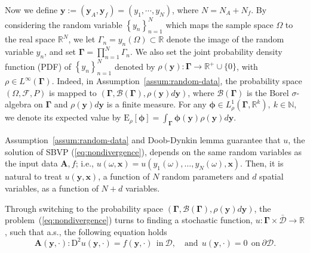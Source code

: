 \documentclass[final,onefignum,onetabnum]{mousaviart}
\begin{document}
	\vspace*{1mm}
	Now we define $\boldsymbol{y} := (\boldsymbol{y}_A, \boldsymbol{y}_f) = (y_1, \cdots, y_N)$, where $N= N_A + N_f$. By considering the random variable $\left\lbrace y_n \right\rbrace _{n=1}^{N}$ which maps the sample space $\Omega$ to the real space $\mathbb{R}^N$, we let $\Gamma_n =y_{n}(\Omega) \subset \mathbb{R} $ denote the image of the random variable $y_n$, and set $\boldsymbol{\Gamma} = \prod_{n= 1}^{N} {\Gamma_n}$. We also set the joint probability density function (PDF) of $\left\lbrace y_n \right\rbrace  _{n= 1}^N$ denoted by $\rho(\boldsymbol{y}):\boldsymbol{\Gamma} \rightarrow \mathbb{R}^{+} \cup \lbrace 0 \rbrace $, with $\rho \in L^\infty(\boldsymbol{\Gamma})$.
	Indeed, in Assumption~\ref{assum:random-data}, the probability space $(\Omega, \mathcal{F}, P)$ is mapped to $(\boldsymbol{\Gamma}, \mathcal{B}(\boldsymbol{\Gamma}), \rho(\boldsymbol{y}) d\boldsymbol{y})$, where $\mathcal{B}(\boldsymbol{\Gamma})$ is the Borel $\sigma$-algebra on $\boldsymbol{\Gamma}$ and $\rho(\boldsymbol{y}) d\boldsymbol{y}$ is a finite measure. 
	For any $\boldsymbol{\phi} \in L^1_{\rho}( \boldsymbol{\Gamma}, \mathbb{R}^k), ~ k \in \mathbb{N} $, we denote its	expected value by $\mathrm{E}_{\rho}[\boldsymbol{\phi}] = \int_{\boldsymbol{\Gamma}} \boldsymbol{\phi}(\boldsymbol{y}) \rho(\boldsymbol{y}) d \boldsymbol{y}$.
	
	Assumption~\ref{assum:random-data} and Doob-Dynkin lemma \cite{Oksendal} guarantee that $u$, the solution of SBVP (\ref{eq:nondivergence}), depends on the same random variables as the input data $\boldsymbol{A}, f$; i.e., $u(\omega, \boldsymbol{x}) = u(y_1(\omega),\dots, y_N(\omega), \boldsymbol{x})$. Then, it is natural to treat $u(\boldsymbol{y}, \boldsymbol{x})$, a function of $N$ random parameters and $d$ spatial variables, as a function of $N+d$ variables.
	
	Through switching to the probability space $(\boldsymbol{\Gamma}, \mathcal{B}(\boldsymbol{\Gamma}), \rho(\boldsymbol{y}) d\boldsymbol{y})$, the problem~(\ref{eq:nondivergence}) turns to finding a stochastic function, $u :\boldsymbol{\Gamma} \times \bar{\mathcal{D}} \rightarrow \mathbb{R} $, such that a.s., the following equation holds
	\begin{equation}
		\label{eq:nondivergence-random-variable}
		\boldsymbol{A}(\boldsymbol{y}, \cdot): \mathrm{D}^2u(\boldsymbol{y}, \cdot) = f( \boldsymbol{y}, \cdot) ~ ~ \mathrm{in}~ \mathcal{D},
		\quad \mathrm{and}~~
		u(\boldsymbol{y}, \cdot) =0 ~~ \mathrm{on}~\partial \mathcal{D}.
	\end{equation}
	
\end{document}
